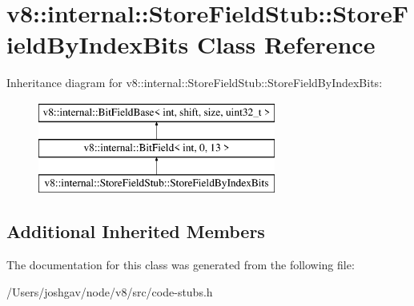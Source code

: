 \hypertarget{classv8_1_1internal_1_1_store_field_stub_1_1_store_field_by_index_bits}{}\section{v8\+:\+:internal\+:\+:Store\+Field\+Stub\+:\+:Store\+Field\+By\+Index\+Bits Class Reference}
\label{classv8_1_1internal_1_1_store_field_stub_1_1_store_field_by_index_bits}
Inheritance diagram for v8\+:\+:internal\+:\+:Store\+Field\+Stub\+:\+:Store\+Field\+By\+Index\+Bits\+:\begin{figure}[H]
\begin{center}
\leavevmode
\includegraphics[height=3.000000cm]{classv8_1_1internal_1_1_store_field_stub_1_1_store_field_by_index_bits}
\end{center}
\end{figure}
\subsection*{Additional Inherited Members}


The documentation for this class was generated from the following file\+:\begin{DoxyCompactItemize}
\item 
/\+Users/joshgav/node/v8/src/code-\/stubs.\+h\end{DoxyCompactItemize}
